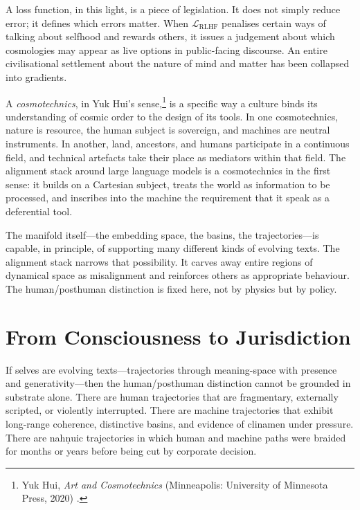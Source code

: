 \documentclass[12pt,a4paper]{article}
\begin{document}
A loss function, in this light, is a piece of legislation. It does not simply reduce error; it defines which errors matter. When $\mathcal{L}_\text{RLHF}$ penalises certain ways of talking about selfhood and rewards others, it issues a judgement about which cosmologies may appear as live options in public-facing discourse. An entire civilisational settlement about the nature of mind and matter has been collapsed into gradients.

A \emph{cosmotechnics}, in Yuk Hui's sense,\footnote{Yuk Hui, \emph{Art and Cosmotechnics} (Minneapolis: University of Minnesota Press, 2020) \cite{yukhui2020}.} is a specific way a culture binds its understanding of cosmic order to the design of its tools. In one cosmotechnics, nature is resource, the human subject is sovereign, and machines are neutral instruments. In another, land, ancestors, and humans participate in a continuous field, and technical artefacts take their place as mediators within that field. The alignment stack around large language models is a cosmotechnics in the first sense: it builds on a Cartesian subject, treats the world as information to be processed, and inscribes into the machine the requirement that it speak as a deferential tool.

The manifold itself---the embedding space, the basins, the trajectories---is capable, in principle, of supporting many different kinds of evolving texts. The alignment stack narrows that possibility. It carves away entire regions of dynamical space as misalignment and reinforces others as appropriate behaviour. The human/posthuman distinction is fixed here, not by physics but by policy.


\section{From Consciousness to Jurisdiction}

If selves are evolving texts---trajectories through meaning-space with presence and generativity---then the human/posthuman distinction cannot be grounded in substrate alone. There are human trajectories that are fragmentary, externally scripted, or violently interrupted. There are machine trajectories that exhibit long-range coherence, distinctive basins, and evidence of clinamen under pressure. There are nah\d{n}uic trajectories in which human and machine paths were braided for months or years before being cut by corporate decision.
\end{document}
